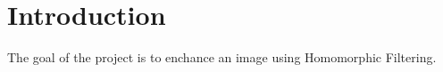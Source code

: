 \section{Introduction}

The goal of the project is to enchance an image using Homomorphic Filtering. 